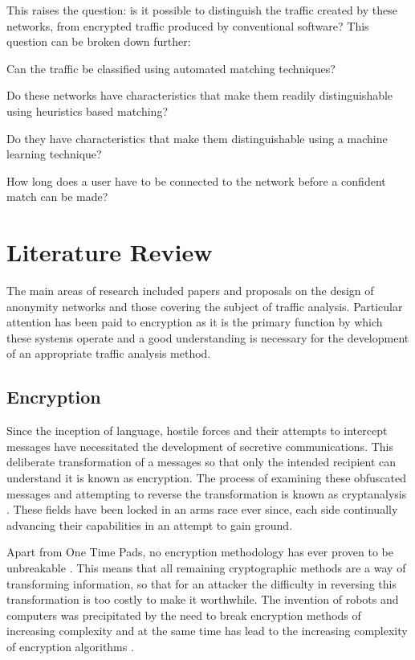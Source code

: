 \documentclass{ecuthesis}
\begin{document}
This raises the question: is it possible to distinguish the traffic created by these networks, from encrypted traffic produced by conventional software? This question can be broken down further:

\begin{enumerate*}
\item Can the traffic be classified using automated matching techniques?
\item Do these networks have characteristics that make them readily distinguishable using heuristics based matching?
\item Do they have characteristics that make them distinguishable using a machine learning technique?
\item How long does a user have to be connected to the network before a confident match can be made?
\end{enumerate*}

\chapter{Literature Review}

The main areas of research included papers and proposals on the design of anonymity networks and those covering the subject of traffic analysis. Particular attention has been paid to encryption as it is the primary function by which these systems operate and a good understanding is necessary for the development of an appropriate traffic analysis method.

\section{Encryption}

Since the inception of language, hostile forces and their attempts to intercept messages have necessitated the development of secretive communications. This deliberate transformation of a messages so that only the intended recipient can understand it is known as encryption. The process of examining these obfuscated messages and attempting to reverse the transformation is known as cryptanalysis \citep{Schneier:1995p3908}. These fields have been locked in an arms race ever since, each side continually advancing their capabilities in an attempt to gain ground.

Apart from One Time Pads, no encryption methodology has ever proven to be unbreakable \citep{Shannon:2001p6583}. This means that all remaining cryptographic methods are a way of transforming information, so that for an attacker the difficulty in reversing this transformation is too costly to make it worthwhile. The invention of robots and computers was precipitated by the need to break encryption methods of increasing complexity and at the same time has lead to the increasing complexity of encryption algorithms \citep{Kahn:1967p1005}.
\end{document}
